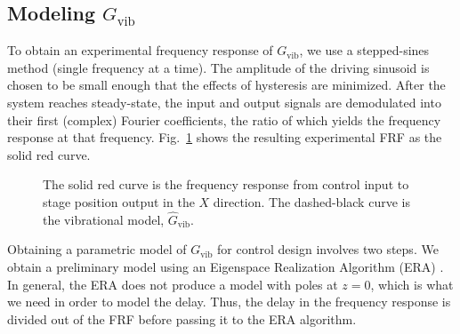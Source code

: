 \documentclass[twocolumn,twoside]{IEEEtran}
\newcommand{\Gv}{\ensuremath{G_{\text{vib}}}\xspace}
\begin{document}
\subsection{Modeling \Gv}\label{sec:vib_model}
To obtain an experimental frequency response of $\Gv$, we use a stepped-sines method (single frequency at a time). The amplitude of the driving sinusoid is chosen to be small enough that the effects of hysteresis are minimized. After the system reaches steady-state, the input and output signals are demodulated into their first (complex) Fourier coefficients, the ratio of which yields the frequency response at that frequency. Fig.~\ref{fig:Guz2stage_frf} shows the resulting experimental FRF as the solid red curve.

\begin{figure}
  \centering
  
  \caption{The solid red curve is the frequency response from control input to stage position output in the $X$ direction. The dashed-black curve is the vibrational model, $\hat{G}_{\textrm{vib}}$.}
  \label{fig:Guz2stage_frf}
\end{figure}

Obtaining a parametric model of $\Gv$ for control design involves two steps. We obtain a preliminary model using an Eigenspace Realization Algorithm (ERA) \cite{Jacques_sysidfrf}. In general, the ERA does not produce a model with poles at $z=0$, which is what we need in order to model the delay. Thus, the delay in the frequency response is divided out of the FRF before passing it to the ERA algorithm.
\end{document}
